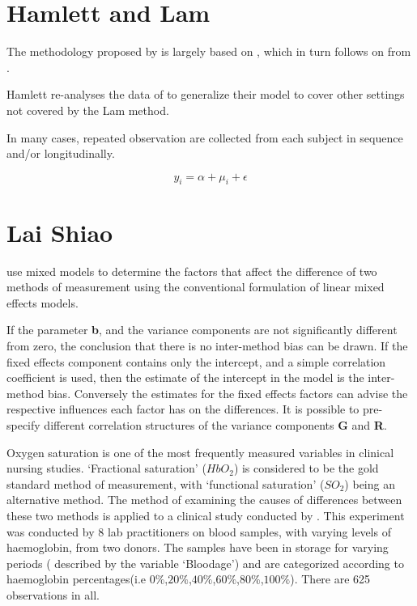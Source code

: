 \documentclass[12pt, a4paper]{report}
\theoremstyle{plain}
\theoremstyle{definition}
\theoremstyle{remark}
\begin{document}
\newpage



\section{Hamlett and Lam}
The methodology proposed by \citet{Roy2009} is largely based on \citet{hamlett}, which in turn follows on from \citet{lam}.



Hamlett re-analyses the data of \citet{lam} to generalize their model to cover other settings not covered by the Lam method.

In many cases, repeated observation are collected from each subject in sequence  and/or longitudinally.


\[ y_i = \alpha + \mu_i + \epsilon \]






		\section{Lai Shiao}
		\citet{LaiShiao} use mixed models to determine the factors that
		affect the difference of two methods of measurement using the
		conventional formulation of linear mixed effects models.
		
		If the parameter \textbf{b}, and the variance components are not
		significantly different from zero, the conclusion that there is no
		inter-method bias can be drawn. If the fixed effects component
		contains only the intercept, and a simple correlation coefficient
		is used, then the estimate of the intercept in the model is the
		inter-method bias. Conversely the estimates for the fixed effects
		factors can advise the respective influences each factor has on
		the differences. It is possible to pre-specify different
		correlation structures of the variance components \textbf{G} and
		\textbf{R}.
		
		
		Oxygen saturation is one of the most frequently measured variables
		in clinical nursing studies. `Fractional saturation' ($HbO_{2}$)
		is considered to be the gold standard method of measurement, with
		`functional saturation' ($SO_{2}$) being an alternative method.
		The method of examining the causes of differences between these
		two methods is applied to a clinical study conducted by
		\citet{Shiao}. This experiment was conducted by 8 lab
		practitioners on blood samples, with varying levels of
		haemoglobin, from two donors. The samples have been in storage for
		varying periods ( described by the variable `Bloodage') and are
		categorized according to haemoglobin percentages(i.e
		$0\%$,$20\%$,$40\%$,$60\%$,$80\%$,$100\%$). There are 625
		observations in all.
		
\end{document}

